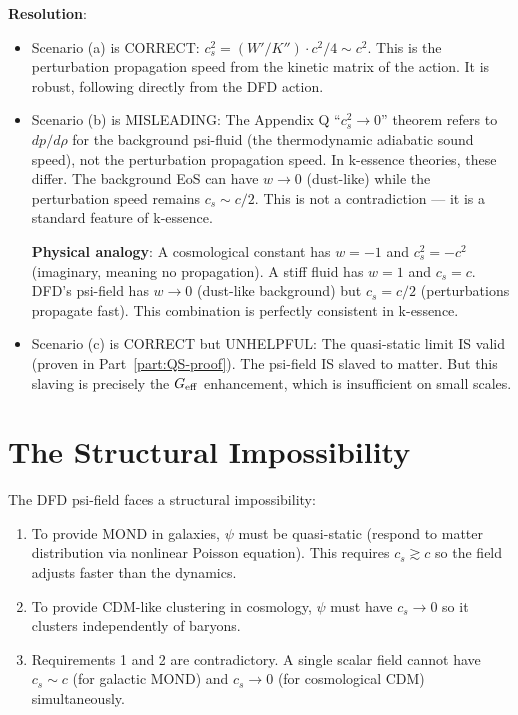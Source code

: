 \documentclass[11pt]{article}
\newcommand{\Geff}{G_{\rm eff}}
\begin{document}
\textbf{Resolution}:
\begin{itemize}
\item Scenario (a) is CORRECT: $c_s^2 = (W'/K'') \cdot c^2/4 \sim c^2$.
  This is the perturbation propagation speed from the kinetic matrix
  of the action. It is robust, following directly from the DFD action.

\item Scenario (b) is MISLEADING: The Appendix Q ``$c_s^2 \to 0$''
  theorem refers to $dp/d\rho$ for the background psi-fluid (the
  thermodynamic adiabatic sound speed), not the perturbation
  propagation speed. In k-essence theories, these differ. The
  background EoS can have $w \to 0$ (dust-like) while the
  perturbation speed remains $c_s \sim c/2$. This is not a
  contradiction --- it is a standard feature of k-essence.

  \textbf{Physical analogy}: A cosmological constant has $w = -1$
  and $c_s^2 = -c^2$ (imaginary, meaning no propagation). A stiff
  fluid has $w = 1$ and $c_s = c$. DFD's psi-field has $w \to 0$
  (dust-like background) but $c_s = c/2$ (perturbations propagate
  fast). This combination is perfectly consistent in k-essence.

\item Scenario (c) is CORRECT but UNHELPFUL: The quasi-static limit
  IS valid (proven in Part~\ref{part:QS-proof}). The psi-field IS
  slaved to matter. But this slaving is precisely the $\Geff$
  enhancement, which is insufficient on small scales.
\end{itemize}

\section{The Structural Impossibility}

The DFD psi-field faces a structural impossibility:
\begin{enumerate}
\item To provide MOND in galaxies, $\psi$ must be quasi-static
  (respond to matter distribution via nonlinear Poisson equation).
  This requires $c_s \gtrsim c$ so the field adjusts faster than
  the dynamics.

\item To provide CDM-like clustering in cosmology, $\psi$ must have
  $c_s \to 0$ so it clusters independently of baryons.

\item Requirements 1 and 2 are contradictory. A single scalar field
  cannot have $c_s \sim c$ (for galactic MOND) and $c_s \to 0$
  (for cosmological CDM) simultaneously.
\end{enumerate}
\end{document}
